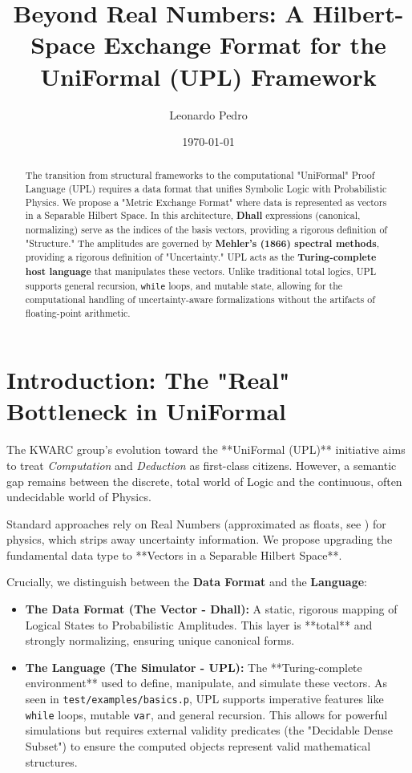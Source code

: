 \documentclass{stex}
\begin{document}
\title{\textbf{Beyond Real Numbers: A Hilbert-Space Exchange Format for the UniFormal (UPL) Framework}}
\author{Leonardo Pedro}
\date{\today}

\maketitle

\begin{abstract}
The transition from structural frameworks to the computational "UniFormal" Proof Language (UPL) requires a data format that unifies Symbolic Logic with Probabilistic Physics. We propose a "Metric Exchange Format" where data is represented as vectors in a Separable Hilbert Space. In this architecture, \textbf{Dhall} expressions (canonical, normalizing) serve as the indices of the basis vectors, providing a rigorous definition of "Structure." The amplitudes are governed by \textbf{Mehler's (1866) spectral methods}, providing a rigorous definition of "Uncertainty." UPL acts as the \textbf{Turing-complete host language} that manipulates these vectors. Unlike traditional total logics, UPL supports general recursion, \texttt{while} loops, and mutable state, allowing for the computational handling of uncertainty-aware formalizations without the artifacts of floating-point arithmetic.
\end{abstract}

\section{Introduction: The "Real" Bottleneck in UniFormal}

The KWARC group's evolution toward the **UniFormal (UPL)** initiative aims to treat \textit{Computation} and \textit{Deduction} as first-class citizens. However, a semantic gap remains between the discrete, total world of Logic and the continuous, often undecidable world of Physics.

Standard approaches rely on Real Numbers (approximated as floats, see \cite{hennigProbabilisticNumericsComputation2022}) for physics, which strips away uncertainty information. We propose upgrading the fundamental data type to **Vectors in a Separable Hilbert Space**.

Crucially, we distinguish between the \textbf{Data Format} and the \textbf{Language}:
\begin{itemize}
    \item \textbf{The Data Format (The Vector - Dhall):} A static, rigorous mapping of Logical States to Probabilistic Amplitudes. This layer is **total** and strongly normalizing, ensuring unique canonical forms.
    \item \textbf{The Language (The Simulator - UPL):} The **Turing-complete environment** used to define, manipulate, and simulate these vectors. As seen in \texttt{test/examples/basics.p}, UPL supports imperative features like \texttt{while} loops, mutable \texttt{var}, and general recursion. This allows for powerful simulations but requires external validity predicates (the "Decidable Dense Subset") to ensure the computed objects represent valid mathematical structures.
\end{itemize}
\end{document}
